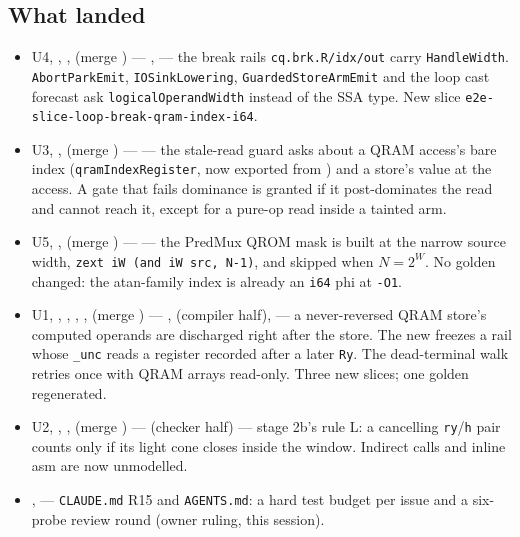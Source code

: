 \subsection*{What landed}
\begin{itemize}
  \item U4, , ,  (merge
  ) --- ,
   --- the break rails
  \texttt{cq.brk.R/idx/out} carry \texttt{HandleWidth}.
  \texttt{AbortParkEmit}, \texttt{IOSinkLowering}, \texttt{GuardedStoreArmEmit}
  and the loop cast forecast ask \texttt{logicalOperandWidth} instead of
  the SSA type. New slice \texttt{e2e-slice-loop-break-qram-index-i64}.
  \item U3, ,  (merge ) ---
   --- the stale-read guard asks about a QRAM
  access's bare index (\texttt{qramIndexRegister}, now exported from
  ) and a store's value at the access. A gate that
  fails dominance is granted if it post-dominates the read and cannot reach
  it, except for a pure-op read inside a tainted arm.
  \item U5, ,  (merge ) ---
   --- the PredMux QROM mask is built at the
  narrow source width, \texttt{zext iW (and iW src, N-1)}, and skipped when
  $N=2^W$. No golden changed: the atan-family index is already an \texttt{i64}
  phi at \texttt{-O1}.
  \item U1, , , ,
  ,  (merge ) ---
  ,  (compiler
  half),  --- a never-reversed QRAM store's
  computed operands are discharged right after the store. The new
   freezes a rail whose \texttt{\_unc} reads a
  register recorded after a later \texttt{Ry}. The dead-terminal walk retries
  once with QRAM arrays read-only. Three new slices; one golden regenerated.
  \item U2, , ,  (merge
  ) ---  (checker half) ---
  stage 2b's rule L: a cancelling \texttt{ry}/\texttt{h} pair counts only if
  its light cone closes inside the window. Indirect calls and inline asm are
  now unmodelled.
  \item {},  --- \texttt{CLAUDE.md} R15 and
  \texttt{AGENTS.md}: a hard test budget per issue and a six-probe review
  round (owner ruling, this session).
\end{itemize}


